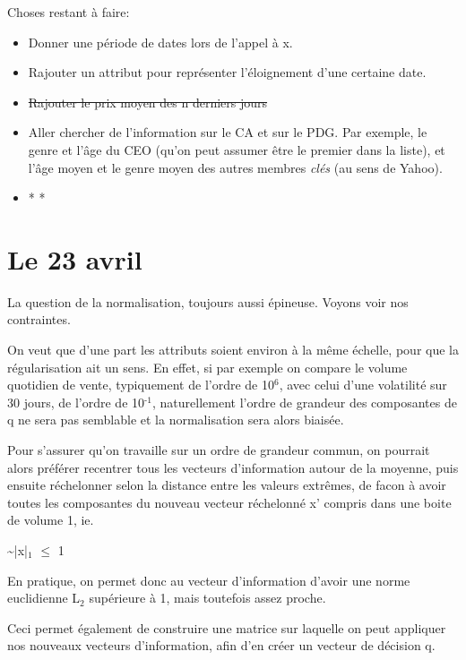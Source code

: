 \documentclass[11pt]{article}
\begin{document}
Choses restant à faire:

\begin{itemize}
\item Donner une période de dates lors de l'appel à x.
\item Rajouter un attribut pour représenter l'éloignement d'une certaine date.
\item \sout{Rajouter le prix moyen des n derniers jours}
\item Aller chercher de l'information sur le CA et sur le PDG. Par exemple, le genre et
l'âge du CEO (qu'on peut assumer être le premier dans la liste), et l'âge moyen et le
genre moyen des autres membres \emph{clés} (au sens de Yahoo).
\end{itemize}


\begin{itemize}
\item * *
\end{itemize}


\section{\textbf{Le 23 avril}}
\label{sec-4}

La question de la normalisation, toujours aussi épineuse. Voyons voir nos contraintes.

On veut que d'une part les attributs soient environ à la même échelle, pour que la
régularisation ait un sens. En effet, si par exemple on compare le volume quotidien de
vente, typiquement de l'ordre de 10$^{\text{6}}$, avec celui d'une volatilité sur 30 jours, de l'ordre
de 10$^{\text{-1}}$, naturellement l'ordre de grandeur des composantes de q ne sera pas semblable et
la normalisation sera alors biaisée.

Pour s'assurer qu'on travaille sur un ordre de grandeur commun, on pourrait alors préférer
recentrer tous les vecteurs d'information autour de la moyenne, puis ensuite réchelonner
selon la distance entre les valeurs extrêmes, de facon à avoir toutes les composantes du
nouveau vecteur réchelonné x' compris dans une boite de volume 1, ie.

\textasciitilde{}|x|$_{\text{1}}$ $\le$ 1

En pratique, on permet donc au vecteur d'information d'avoir une norme euclidienne L$_{\text{2}}$
supérieure à 1, mais toutefois assez proche.

Ceci permet également de construire une matrice sur laquelle on peut appliquer nos
nouveaux vecteurs d'information, afin d'en créer un vecteur de décision q.
\end{document}
